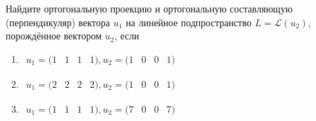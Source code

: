 \documentclass[pdftex,11pt,openany]{book}\usepackage[]{graphicx}\usepackage[]{color}
\begin{document}
\begin{problem}
Найдите ортогональную проекцию и ортогональную составляющую (перпендикуляр) вектора $u_1$ на линейное подпространство $L = \mathcal{L}(u_2)$, порождённое вектором $u_2$, если
\begin{enumerate}
\item $\begin{matrix} u_1 = (1 & 1 & 1 & 1), u_2 = (1 & 0 & 0 & 1) \end{matrix}$
\item $\begin{matrix} u_1 = (2 & 2 & 2 & 2), u_2 = (1 & 0 & 0 & 1) \end{matrix}$
\item $\begin{matrix} u_1 = (1 & 1 & 1 & 1), u_2 = (7 & 0 & 0 & 7) \end{matrix}$
\end{enumerate}
\end{problem}

\begin{solution}
\end{solution}
\end{document}
